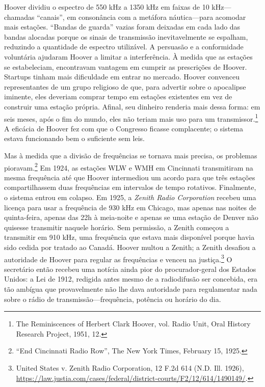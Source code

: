 \documentclass{book}
\newcommand{\ingles}[1]{\textit{#1}}
\begin{document}
Hoover dividiu o espectro de 550 kHz a 1350 kHz em faixas de 10 kHz---chamadas
``canais'', em consonância com a metáfora náutica---para acomodar mais estações.
``Bandas de guarda'' vazias foram deixadas em cada lado das bandas alocadas porque
os sinais de transmissão inevitavelmente se espalham, reduzindo a quantidade de
espectro utilizável. A persuasão e a conformidade voluntária ajudaram Hoover a
limitar a interferência. À medida que as estações se estabeleciam, encontravam
vantagem em cumprir as prescrições de Hoover. Startups tinham mais dificuldade em
entrar no mercado. Hoover convenceu representantes de um grupo religioso de que,
para advertir sobre o apocalipse iminente, eles deveriam comprar tempo em estações
existentes em vez de construir uma estação própria. Afinal, seu dinheiro renderia
mais dessa forma: em seis meses, após o fim do mundo, eles não teriam mais uso
para um transmissor.\footnote{The Reminiscences of Herbert Clark Hoover, vol.
Radio Unit, Oral History Research Project, 1951, 12.} A eficácia de Hoover fez
com que o Congresso ficasse complacente; o sistema estava funcionando bem o
suficiente sem leis.

Mas à medida que a divisão de frequências se tornava mais precisa, os problemas
pioravam.\footnote{``End Cincinnati Radio Row'', The New York Times, February 15,
1925.} Em 1924, as estações WLW e WMH em Cincinnati transmitiram na mesma frequência
até que Hoover intermediou um acordo para que três estações compartilhassem duas
frequências em intervalos de tempo rotativos. Finalmente, o sistema entrou em
colapso. Em 1925, a \ingles{Zenith Radio Corporation} recebeu uma licença para
usar a frequência de 930 kHz em Chicago, mas apenas nas noites de quinta-feira,
apenas das 22h à meia-noite e apenas se uma estação de Denver não quisesse
transmitir naquele horário. Sem permissão, a Zenith começou a transmitir em 910
kHz, uma frequência que estava mais disponível porque havia sido cedida por
tratado ao Canadá. Hoover multou a Zenith; a Zenith desafiou a autoridade de
Hoover para regular as frequências e venceu na justiça.\footnote{United States v.
Zenith Radio Corporation, 12 F.2d 614 (N.D. Ill. 1926),
\url{https://law.justia.com/cases/federal/district-courts/F2/12/614/1490149/}.}
O secretário então recebeu uma notícia ainda pior do procurador-geral dos Estados
Unidos: a Lei de 1912, redigida antes mesmo de a radiodifusão ser concebida, era
tão ambígua que provavelmente não lhe dava autoridade para regulamentar nada sobre
o rádio de transmissão---frequência, potência ou horário do dia.
\end{document}
